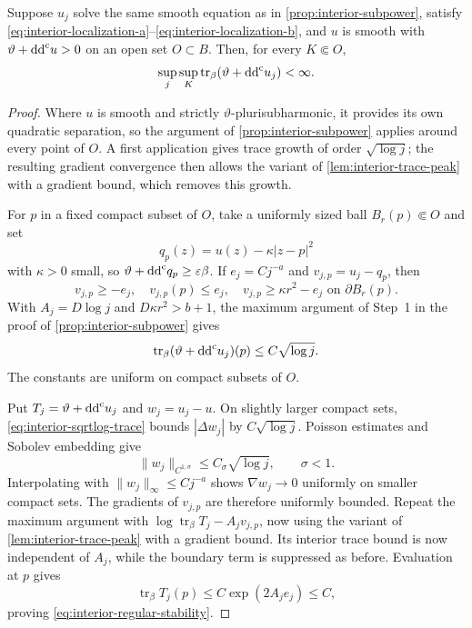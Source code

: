 \begin{proposition}\label{prop:interior-regular-stability}
Suppose $u_j$ solve the same smooth equation as in \cref{prop:interior-subpower}, satisfy \eqref{eq:interior-localization-a}--\eqref{eq:interior-localization-b}, and $u$ is smooth with $\vartheta+\mathrm{dd}^{\mathrm{c}} u>0$ on an open set $O\subset B$. Then, for every $K\Subset O$,
\begin{equation}\label{eq:interior-regular-stability}
  \sup_j\sup_K\operatorname{tr}_\beta(\vartheta+\mathrm{dd}^{\mathrm{c}} u_j)<\infty.
\end{equation}
\end{proposition}

\begin{proof}
Where $u$ is smooth and strictly $\vartheta$-plurisubharmonic, it provides its own quadratic separation, so the argument of \cref{prop:interior-subpower} applies around every point of $O$. A first application gives trace growth of order $\sqrt{\log j}$; the resulting gradient convergence then allows the variant of \cref{lem:interior-trace-peak} with a gradient bound, which removes this growth.

For $p$ in a fixed compact subset of $O$, take a uniformly sized ball $B_r(p)\Subset O$ and set
\[
  q_p(z)=u(z)-\kappa|z-p|^2
\]
with $\kappa>0$ small, so $\vartheta+\mathrm{dd}^{\mathrm{c}} q_p\geq\varepsilon\beta$. If $e_j=Cj^{-a}$ and $v_{j,p}=u_j-q_p$, then
\[
  v_{j,p}\geq-e_j,
  \quad v_{j,p}(p)\leq e_j,
  \quad v_{j,p}\geq\kappa r^2-e_j\text{ on }\partial B_r(p).
\]
With $A_j=D\log j$ and $D\kappa r^2>b+1$, the maximum argument of Step~1 in the proof of \cref{prop:interior-subpower} gives
\begin{equation}\label{eq:interior-sqrtlog-trace}
  \operatorname{tr}_\beta(\vartheta+\mathrm{dd}^{\mathrm{c}} u_j)(p)\leq C\sqrt{\log j}.
\end{equation}
The constants are uniform on compact subsets of $O$.

Put $T_j=\vartheta+\mathrm{dd}^{\mathrm{c}} u_j$ and $w_j=u_j-u$. On slightly larger compact sets, \eqref{eq:interior-sqrtlog-trace} bounds $|\Delta w_j|$ by $C\sqrt{\log j}$. Poisson estimates and Sobolev embedding give
\[
  \lVert w_j\rVert_{C^{1,\sigma}}\leq C_\sigma\sqrt{\log j},
  \qquad \sigma<1.
\]
Interpolating with $\lVert w_j\rVert_\infty\leq Cj^{-a}$ shows $\nabla w_j\to0$ uniformly on smaller compact sets. The gradients of $v_{j,p}$ are therefore uniformly bounded. Repeat the maximum argument with $\log\operatorname{tr}_\beta T_j-A_jv_{j,p}$, now using the variant of \cref{lem:interior-trace-peak} with a gradient bound. Its interior trace bound is now independent of $A_j$, while the boundary term is suppressed as before. Evaluation at $p$ gives
\[
  \operatorname{tr}_\beta T_j(p)\leq C\exp(2A_je_j)\leq C,
\]
proving \eqref{eq:interior-regular-stability}.
\end{proof}



